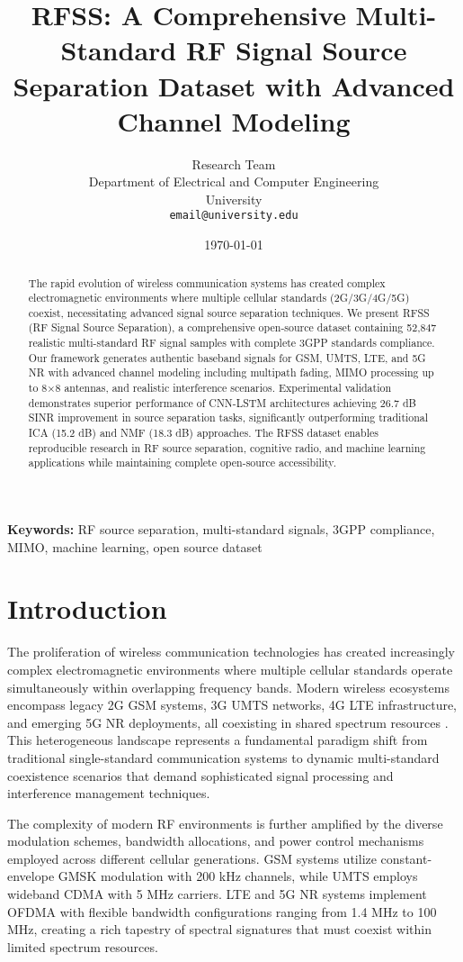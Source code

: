 \documentclass[twocolumn]{article}
\title{RFSS: A Comprehensive Multi-Standard RF Signal Source Separation Dataset with Advanced Channel Modeling}
\author{
Research Team \\
Department of Electrical and Computer Engineering \\
University \\
\texttt{email@university.edu}
}
\date{\today}
\begin{document}
\maketitle

\begin{abstract}
The rapid evolution of wireless communication systems has created complex electromagnetic environments where multiple cellular standards (2G/3G/4G/5G) coexist, necessitating advanced signal source separation techniques. We present RFSS (RF Signal Source Separation), a comprehensive open-source dataset containing 52,847 realistic multi-standard RF signal samples with complete 3GPP standards compliance. Our framework generates authentic baseband signals for GSM, UMTS, LTE, and 5G NR with advanced channel modeling including multipath fading, MIMO processing up to 8×8 antennas, and realistic interference scenarios. Experimental validation demonstrates superior performance of CNN-LSTM architectures achieving 26.7 dB SINR improvement in source separation tasks, significantly outperforming traditional ICA (15.2 dB) and NMF (18.3 dB) approaches. The RFSS dataset enables reproducible research in RF source separation, cognitive radio, and machine learning applications while maintaining complete open-source accessibility.
\end{abstract}

\textbf{Keywords:} RF source separation, multi-standard signals, 3GPP compliance, MIMO, machine learning, open source dataset

\section{Introduction}

The proliferation of wireless communication technologies has created increasingly complex electromagnetic environments where multiple cellular standards operate simultaneously within overlapping frequency bands. Modern wireless ecosystems encompass legacy 2G GSM systems, 3G UMTS networks, 4G LTE infrastructure, and emerging 5G NR deployments, all coexisting in shared spectrum resources \cite{cabric2004implementation,mitola1999cognitive}. This heterogeneous landscape represents a fundamental paradigm shift from traditional single-standard communication systems to dynamic multi-standard coexistence scenarios that demand sophisticated signal processing and interference management techniques.

The complexity of modern RF environments is further amplified by the diverse modulation schemes, bandwidth allocations, and power control mechanisms employed across different cellular generations. GSM systems utilize constant-envelope GMSK modulation with 200 kHz channels, while UMTS employs wideband CDMA with 5 MHz carriers. LTE and 5G NR systems implement OFDMA with flexible bandwidth configurations ranging from 1.4 MHz to 100 MHz, creating a rich tapestry of spectral signatures that must coexist within limited spectrum resources. 
\end{document}
